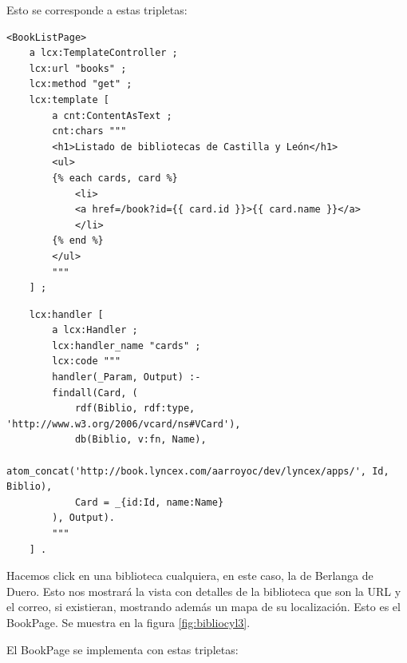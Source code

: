 \documentclass[openright,twoside,12pt]{book}
\begin{document}
Esto se corresponde a estas tripletas:

\begin{lstlisting}
<BookListPage>
    a lcx:TemplateController ;
    lcx:url "books" ;
    lcx:method "get" ;
    lcx:template [
        a cnt:ContentAsText ;
        cnt:chars """
        <h1>Listado de bibliotecas de Castilla y León</h1>
        <ul>
        {% each cards, card %}
            <li>
            <a href=/book?id={{ card.id }}>{{ card.name }}</a>
            </li>
        {% end %}
        </ul>
        """
    ] ;
\end{lstlisting}
\begin{lstlisting}
    lcx:handler [
        a lcx:Handler ;
        lcx:handler_name "cards" ;
        lcx:code """
        handler(_Param, Output) :-
        findall(Card, (
            rdf(Biblio, rdf:type, 'http://www.w3.org/2006/vcard/ns#VCard'),
            db(Biblio, v:fn, Name),
            atom_concat('http://book.lyncex.com/aarroyoc/dev/lyncex/apps/', Id, Biblio),
            Card = _{id:Id, name:Name}
        ), Output).
        """
    ] .
\end{lstlisting}

Hacemos click en una biblioteca cualquiera, en este caso, la de Berlanga de Duero. Esto nos mostrará la vista con detalles de la biblioteca que son la URL y el correo, si existieran, mostrando además un mapa de su localización. Esto es el BookPage. Se muestra en la figura \ref{fig:bibliocyl3}.

El BookPage se implementa con estas tripletas:
\end{document}
